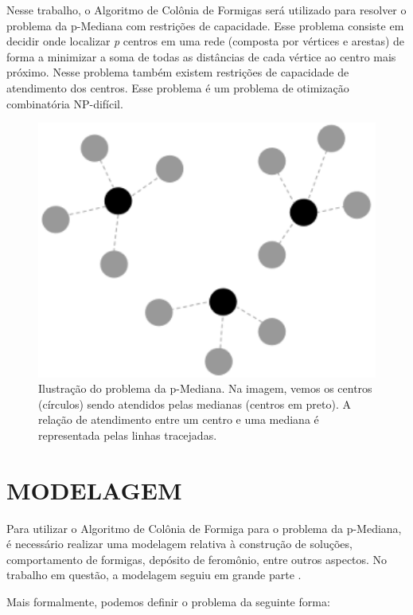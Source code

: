 \documentclass[12pt]{article}
\begin{document}
Nesse trabalho, o Algoritmo de Colônia de Formigas será utilizado para resolver o problema da p-Mediana
com restrições de capacidade. Esse problema consiste em decidir onde localizar \textit{p} centros em uma
rede (composta por vértices e arestas) de forma a minimizar a soma de todas as distâncias de cada vértice
ao centro mais próximo. Nesse problema também existem restrições de capacidade de atendimento dos centros.
Esse problema é um problema de otimização combinatória NP-difícil.

\begin{figure}[ht]
  \centering
  \includegraphics[width=1\textwidth]{pmedian.png}
  \caption{Ilustração do problema da p-Mediana. Na imagem, vemos os centros (círculos)
  sendo atendidos pelas medianas (centros em preto). A relação de atendimento entre um centro
  e uma mediana é representada pelas linhas tracejadas.}
  \label{fig:pmedian}
\end{figure}

\section{MODELAGEM} \label{sec:model}

Para utilizar o Algoritmo de Colônia de Formiga para o problema da p-Mediana, é necessário realizar uma
modelagem relativa à construção de soluções, comportamento de formigas, depósito de feromônio, entre outros
aspectos. No trabalho em questão, a modelagem seguiu em grande parte \cite{DBLP:journals/informaticaSI/FrancaZC05}.

Mais formalmente, podemos definir o problema da seguinte forma:
\end{document}
